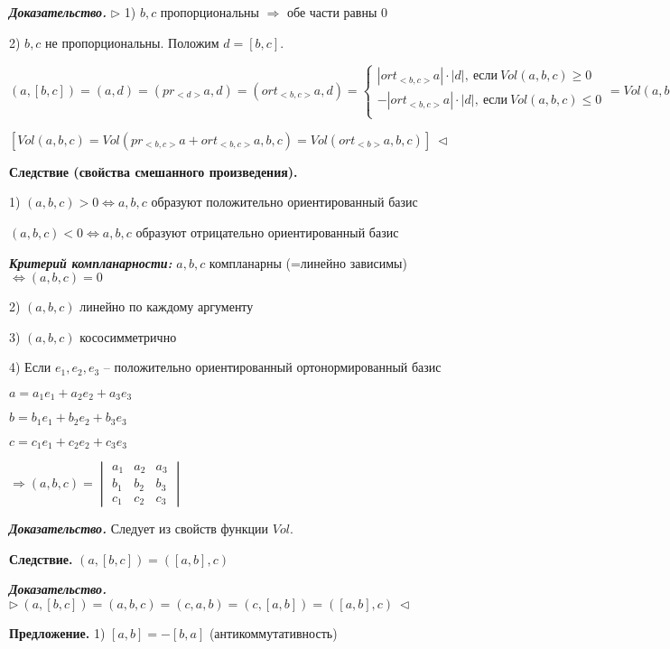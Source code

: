 \bigskip
\textbf{\textit{Доказательство.}} $\rhd$ 1) $b, c$ пропорциональны $\Rightarrow$ обе части равны 0

2) $b, c$ не пропорциональны. Положим $d = [b, c]$. 

$(a, [b, c]) = (a, d) = (pr_{<d>} a, d) = (ort_{<b, c>}a, d) = \begin{cases}
		|ort_{<b, c>} a| \cdot |d|, \ если \ Vol(a, b, c) \geq 0 \\
		-|ort_{<b, c>} a| \cdot |d|, \ если \ Vol(a, b, c) \leq 0 \\
	\end{cases} = Vol(a, b, c)$

$\left[Vol(a, b, c) = Vol(pr_{<b, c>}a + ort_{<b, c>}a, b, c) = Vol(ort_{<b>}a, b, c)\right] \ \lhd$

\bigskip
\textbf{Следствие (свойства смешанного произведения).}

1) $(a, b, c) > 0 \Leftrightarrow a, b, c$ образуют положительно ориентированный базис 

$(a, b, c) < 0 \Leftrightarrow a, b, c$ образуют отрицательно ориентированный базис

\bigskip
\textbf{\textit{Критерий компланарности:}} $a, b, c$ компланарны (=линейно зависимы) $\Leftrightarrow (a, b, c) = 0$

2) $(a, b, c)$ линейно по каждому аргументу

3) $(a, b, c)$ кососимметрично

4) Если $e_1, e_2, e_3$ -- положительно ориентированный ортонормированный базис 

$a = a_1 e_1 + a_2 e_2 + a_3 e_3$

$b = b_1 e_1 + b_2 e_2 + b_3 e_3$

$c = c_1 e_1 + c_2 e_2 + c_3 e_3$

$\Rightarrow (a, b, c) = \begin{vmatrix} a_1 & a_2 & a_3 \\ b_1 & b_2 & b_3 \\ c_1 & c_2 & c_3 \end{vmatrix}$

\bigskip
\textit{\textbf{Доказательство.}} Следует из свойств функции $Vol$.

\bigskip
\textbf{Следствие.} $(a, [b, c]) = ([a, b], c)$

\bigskip
\textbf{\textit{Доказательство.}} $\rhd \ (a, [b, c]) = (a, b, c) = (c, a, b) = (c, [a, b]) = ([a, b], c) \ \lhd$

\bigskip
\textbf{Предложение.} 1) $[a, b] = -[b, a]$ (антикоммутативность)

